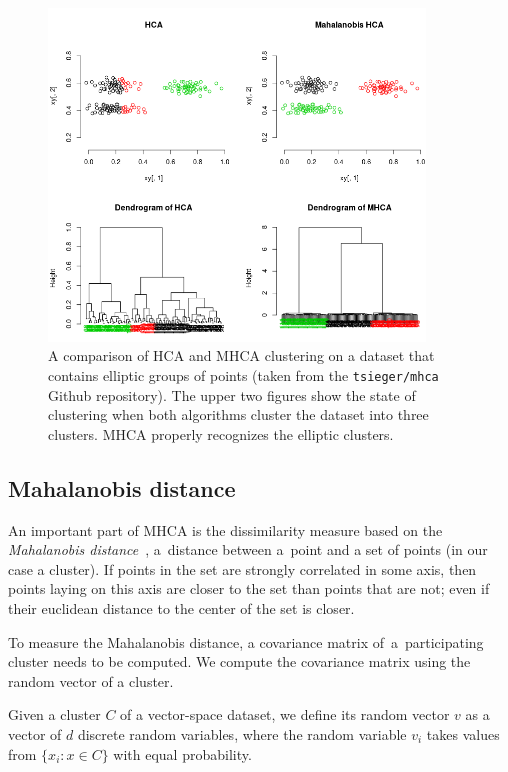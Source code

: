 \begin{figure}[t]\centering
	\includegraphics[width=10cm]{img/mhca}
	\caption{A comparison of HCA and MHCA clustering on a dataset that contains elliptic groups of points (taken from the \texttt{tsieger/mhca} Github repository). The upper two figures show the state of clustering when both algorithms cluster the dataset into three clusters. MHCA properly recognizes the elliptic clusters.}
	\label{fig01:mhca}
\end{figure}

\subsection{Mahalanobis distance}

An important part of MHCA is the dissimilarity measure based on the \emph{Mahalanobis distance}~\cite{mahalanobis1936generalized}, a~distance between a~point and a set of points (in our case a cluster). If points in the set are strongly correlated in some axis, then points laying on this axis are closer to the set than points that are not; even if their euclidean distance to the center of the set is closer.

To measure the Mahalanobis distance, a covariance matrix of~a~participating cluster needs to be computed. We compute the covariance matrix using the random vector of a cluster.

\begin{defn}
	Given a cluster $C$ of a vector-space dataset, we define its random vector $v$ as a vector of $d$ discrete random variables, where the random variable $v_i$ takes values from $\{x_i:x\in C\}$ with equal probability.
\end{defn}

